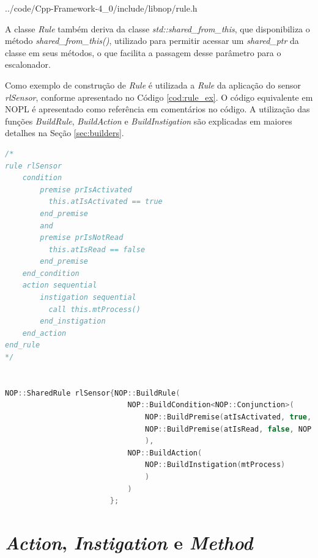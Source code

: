 
            {../code/Cpp-Framework-4_0/include/libnop/rule.h}

A classe \textit{Rule} também deriva da classe \textit{std::shared\_from\_this},
que disponibiliza o método \textit{shared\_from\_this()}, utilizado para
permitir acessar um \textit{shared\_ptr} da classe em seus métodos, o que
facilita a passagem desse parâmetro para o escalonador.

Como exemplo de construção de \textit{Rule} é utilizada a \textit{Rule} da
aplicação do sensor \textit{rlSensor}, conforme apresentado no Código
\ref{cod:rule_ex}. O código equivalente em NOPL é apresentado como referência em
comentários no código. A utilização das funções \textit{BuildRule},
\textit{BuildAction} e \textit{BuildInstigation} são explicadas em maiores
detalhes na Seção \ref{sec:builders}.

\begin{lstlisting}[language=C++,
caption = {Criação de \textit{Rules} no \textit{Framework} PON C++ 4.0},
source = {Autoria própria},
label ={cod:rule_ex}]
/* 
rule rlSensor
    condition
        premise prIsActivated
          this.atIsActivated == true
        end_premise
        and
        premise prIsNotRead
          this.atIsRead == false
        end_premise
    end_condition
    action sequential
        instigation sequential
          call this.mtProcess()
        end_instigation
    end_action
end_rule
*/


NOP::SharedRule rlSensor{NOP::BuildRule(
                            NOP::BuildCondition<NOP::Conjunction>(
                                NOP::BuildPremise(atIsActivated, true, NOP::Equal()),
                                NOP::BuildPremise(atIsRead, false, NOP::Equal())
                                ),
                            NOP::BuildAction(
                                NOP::BuildInstigation(mtProcess)
                                )
                            )
                        };
\end{lstlisting}

\section{\textit{Action}, \textit{Instigation} e \textit{Method}}\label{sec:instigations}

